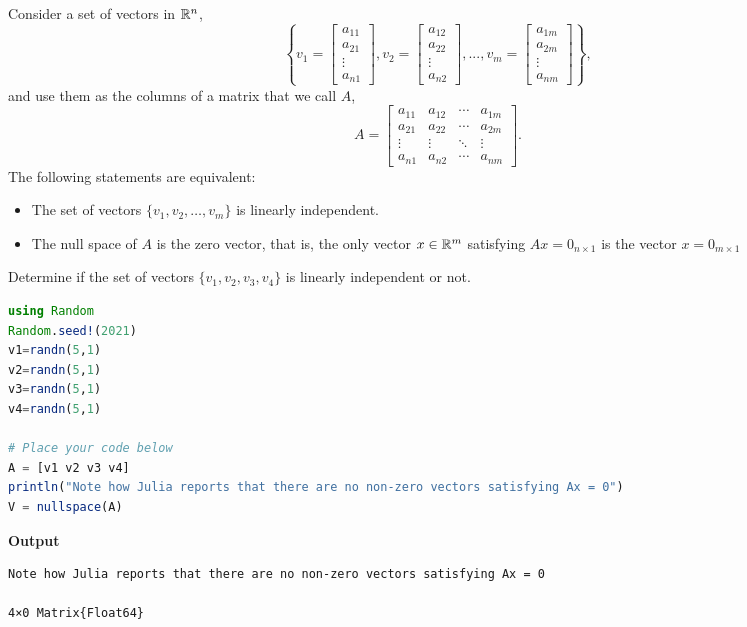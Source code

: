 \vspace*{.2cm}

\begin{tcolorbox}[title=\textbf{Another Test for Linear Independence}] Consider a set of vectors in $\mathbb R^n$,
$$\left\{v_1=\begin{bmatrix} a_{11} \\ a_{21}\\ \vdots \\ a_{n1} \end{bmatrix},  v_2=\begin{bmatrix} a_{12} \\ a_{22}\\ \vdots \\ a_{n2} \end{bmatrix}, ...,  v_m=\begin{bmatrix} a_{1m} \\ a_{2m}\\ \vdots \\ a_{nm} \end{bmatrix} \right\},$$ 
and use them as the columns of a matrix that we call $A$,
\begin{equation}
\label{eq:MatrixFromLinearIndependence_proTipCC}    
A=\left[\begin{array}{cccc} a_{11}& a_{12}& \cdots & a_{1m} \\
 a_{21}& a_{22}& \cdots & a_{2m}  \\
 \vdots & \vdots&  \ddots & \vdots \\
 a_{n1}& a_{n2}& \cdots & a_{nm} 
 \end{array}\right].
 \end{equation}
 The following statements are equivalent:
 \begin{itemize}
     \item  The set of vectors $ \{v_1, v_2, \ldots, v_m \} $ is linearly independent.
     \item The null space of $A$ is the zero vector, that is, the only vector $x\in \mathbb R^m$ satisfying $Ax = 0_{n \times 1}$ is the vector $x = 0_{m \times 1}$
 \end{itemize}
\end{tcolorbox}

\vspace*{.2cm}

Determine if the set of vectors $\{v_1, v_2, v_3, v_4\}$ is linearly independent or not. 
\begin{lstlisting}[language=Julia,style=mystyle]
using Random
Random.seed!(2021)
v1=randn(5,1)
v2=randn(5,1)
v3=randn(5,1)
v4=randn(5,1)

# Place your code below
A = [v1 v2 v3 v4]
println("Note how Julia reports that there are no non-zero vectors satisfying Ax = 0")
V = nullspace(A)
\end{lstlisting}
\textbf{Output} 
\begin{verbatim}
Note how Julia reports that there are no non-zero vectors satisfying Ax = 0

4×0 Matrix{Float64}
\end{verbatim}

